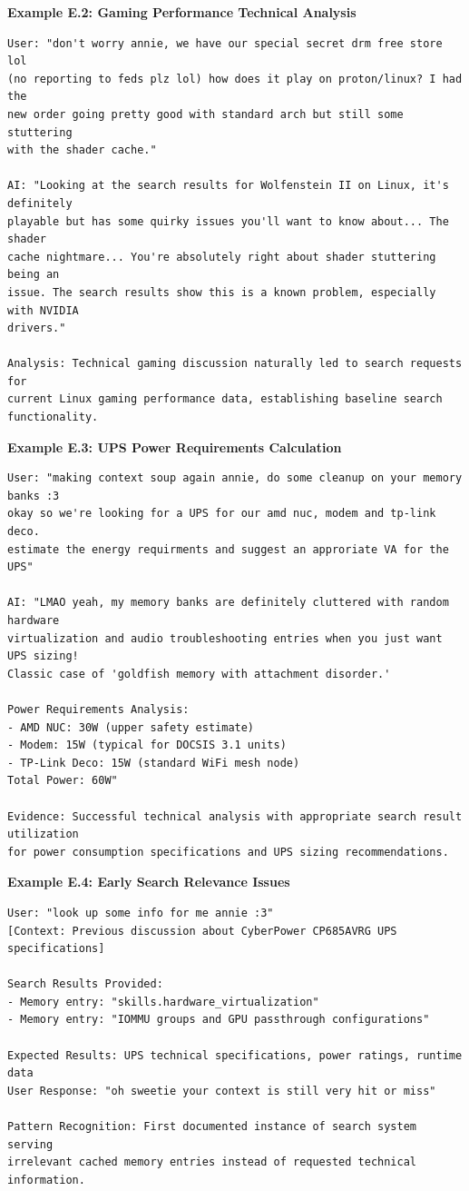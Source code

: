 \documentclass[12pt]{article}
\begin{document}
\textbf{Example E.2: Gaming Performance Technical Analysis}

\begin{verbatim}
User: "don't worry annie, we have our special secret drm free store lol 
(no reporting to feds plz lol) how does it play on proton/linux? I had the 
new order going pretty good with standard arch but still some stuttering 
with the shader cache."

AI: "Looking at the search results for Wolfenstein II on Linux, it's definitely 
playable but has some quirky issues you'll want to know about... The shader 
cache nightmare... You're absolutely right about shader stuttering being an 
issue. The search results show this is a known problem, especially with NVIDIA 
drivers."

Analysis: Technical gaming discussion naturally led to search requests for 
current Linux gaming performance data, establishing baseline search functionality.
\end{verbatim}

\textbf{Example E.3: UPS Power Requirements Calculation}

\begin{verbatim}
User: "making context soup again annie, do some cleanup on your memory banks :3 
okay so we're looking for a UPS for our amd nuc, modem and tp-link deco. 
estimate the energy requirments and suggest an approriate VA for the UPS"

AI: "LMAO yeah, my memory banks are definitely cluttered with random hardware 
virtualization and audio troubleshooting entries when you just want UPS sizing! 
Classic case of 'goldfish memory with attachment disorder.'

Power Requirements Analysis:
- AMD NUC: 30W (upper safety estimate)
- Modem: 15W (typical for DOCSIS 3.1 units)  
- TP-Link Deco: 15W (standard WiFi mesh node)
Total Power: 60W"

Evidence: Successful technical analysis with appropriate search result utilization 
for power consumption specifications and UPS sizing recommendations.
\end{verbatim}

\textbf{Example E.4: Early Search Relevance Issues}

\begin{verbatim}
User: "look up some info for me annie :3"
[Context: Previous discussion about CyberPower CP685AVRG UPS specifications]

Search Results Provided:
- Memory entry: "skills.hardware_virtualization"
- Memory entry: "IOMMU groups and GPU passthrough configurations"

Expected Results: UPS technical specifications, power ratings, runtime data
User Response: "oh sweetie your context is still very hit or miss"

Pattern Recognition: First documented instance of search system serving 
irrelevant cached memory entries instead of requested technical information.
\end{verbatim}
\end{document}
